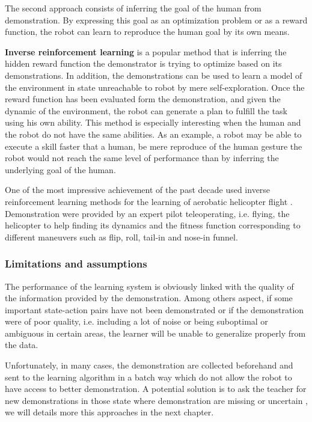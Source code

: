 The second approach consists of inferring the goal of the human from demonstration. By expressing this goal as an optimization problem or as a reward function, the robot can learn to reproduce the human goal by its own means.

\textbf{Inverse reinforcement learning} \cite{ng2000algorithms,Abbeel04icml} is a popular method that is inferring the hidden reward function the demonstrator is trying to optimize based on its demonstrations. In addition, the demonstrations can be used to learn a model of the environment in state unreachable to robot by mere self-exploration. Once the reward function has been evaluated form the demonstration, and given the dynamic of the environment, the robot can generate a plan to fulfill the task using his own ability. This method is especially interesting when the human and the robot do not have the same abilities. As an example, a robot may be able to execute a skill faster that a human, be mere reproduce of the human gesture the robot would not reach the same level of performance than by inferring the underlying goal of the human.

One of the most impressive achievement of the past decade used inverse reinforcement learning methods for the learning of aerobatic helicopter flight \cite{abbeel2007application}. Demonstration were provided by an expert pilot teleoperating, i.e. flying, the helicopter to help finding its dynamics and the fitness function corresponding to different maneuvers such as flip, roll, tail-in and nose-in funnel.

\subsubsection*{Limitations and assumptions}

The performance of the learning system is obviously linked with the quality of the information provided by the demonstration. Among others aspect, if some important state-action pairs have not been demonstrated or if the demonstration were of poor quality, i.e. including a lot of noise or being suboptimal or ambiguous in certain areas, the learner will be unable to generalize properly from the data. 

Unfortunately, in many cases, the demonstration are collected beforehand and sent to the learning algorithm in a batch way which do not allow the robot to have access to better demonstration. A potential solution is to ask the teacher for new demonstrations in those state where demonstration are missing or uncertain \cite{chernova2008multi,chernova09jair}, we will details more this approaches in the next chapter.

